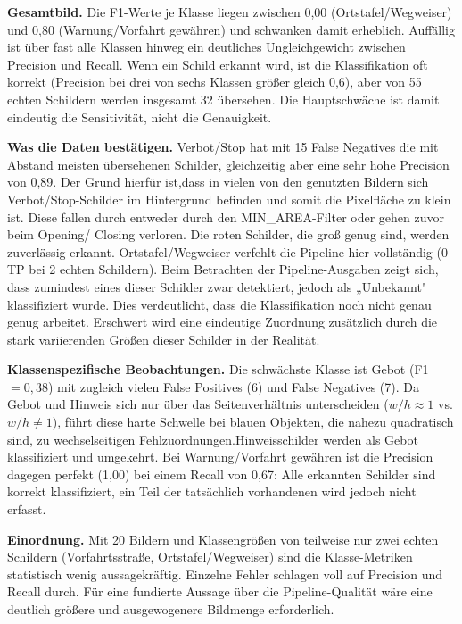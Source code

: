 \documentclass[12pt,oneside]{article}
\begin{document}
\textbf{Gesamtbild.}  Die F1-Werte je Klasse liegen zwischen 0,00 (Ortstafel/Wegweiser) und 0,80 (Warnung/Vorfahrt gewähren) und schwanken damit erheblich. Auffällig ist über fast alle Klassen hinweg ein deutliches Ungleichgewicht zwischen Precision und Recall. Wenn ein Schild erkannt wird, ist die Klassifikation oft korrekt (Precision bei drei von sechs Klassen größer gleich 0,6), aber von 55 echten Schildern werden insgesamt 32 übersehen. Die Hauptschwäche ist damit eindeutig die Sensitivität, nicht die Genauigkeit.

\textbf{Was die Daten bestätigen.} Verbot/Stop hat mit 15 False Negatives die mit Abstand meisten übersehenen Schilder, gleichzeitig aber eine sehr hohe Precision von 0,89. Der Grund hierfür ist,dass in vielen von den genutzten Bildern sich Verbot/Stop-Schilder im Hintergrund befinden und somit die Pixelfläche zu klein ist. Diese fallen durch entweder durch den MIN\_AREA-Filter oder gehen zuvor beim Opening/ Closing verloren. Die roten Schilder, die groß genug sind, werden zuverlässig erkannt. Ortstafel/Wegweiser verfehlt die Pipeline hier vollständig (0 TP bei 2 echten Schildern). Beim Betrachten der Pipeline-Ausgaben zeigt sich, dass zumindest eines dieser Schilder zwar detektiert, jedoch als „Unbekannt" klassifiziert wurde. Dies verdeutlicht, dass die Klassifikation noch nicht genau genug arbeitet. Erschwert wird eine eindeutige Zuordnung zusätzlich durch die stark variierenden Größen dieser Schilder in der Realität.

\textbf{Klassenspezifische Beobachtungen.} Die schwächste Klasse ist Gebot (F1 $= 0{,}38$) mit zugleich vielen False Positives (6) und False Negatives (7). Da Gebot und Hinweis sich nur über das Seitenverhältnis unterscheiden ($w/h \approx 1$ vs. $w/h \neq 1$), führt diese harte Schwelle bei blauen Objekten, die nahezu quadratisch sind, zu wechselseitigen Fehlzuordnungen.Hinweisschilder werden als Gebot klassifiziert und umgekehrt. Bei Warnung/Vorfahrt gewähren ist die Precision dagegen perfekt (1,00) bei einem Recall von 0,67: Alle erkannten Schilder sind korrekt klassifiziert, ein Teil der tatsächlich vorhandenen wird jedoch nicht erfasst.

\textbf{Einordnung.} Mit 20 Bildern und Klassengrößen von teilweise nur zwei echten Schildern (Vorfahrtsstraße, Ortstafel/Wegweiser) sind die Klasse-Metriken statistisch wenig aussagekräftig. Einzelne Fehler schlagen voll auf Precision und Recall durch. Für eine fundierte Aussage über die Pipeline-Qualität wäre eine deutlich größere und ausgewogenere Bildmenge erforderlich.
\end{document}
